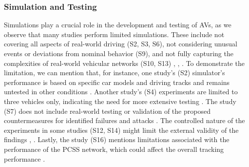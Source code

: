 \documentclass[a4paper,12pt]{article}
\begin{document}
\subsubsection{Simulation and Testing}
\hspace{5mm} Simulations play a crucial role in the development and testing of AVs, as we observe that many studies perform limited simulations. These include not covering all aspects of real-world driving (S2, S3, S6), not considering unusual events or deviations from nominal behavior (S9), and not fully capturing the complexities of real-world vehicular networks (S10, S13) \cite{s9}, \cite{s10}, \cite{s13}. To demonstrate the limitation, we can mention that, for instance, one study's (S2) simulator's performance is based on specific car models and driving tracks and remains untested in other conditions \cite{s2}. Another study's (S4) experiments are limited to three vehicles only, indicating the need for more extensive testing \cite{s4}. The study (S7) does not include real-world testing or validation of the proposed countermeasures for identified failures and attacks \cite{s7}. The controlled nature of the experiments in some studies (S12, S14) might limit the external validity of the findings \cite{s12}, \cite{s14}. Lastly, the study (S16) mentions limitations associated with the performance of the PCSS network, which could affect the overall tracking performance \cite{s16}.
\end{document}
